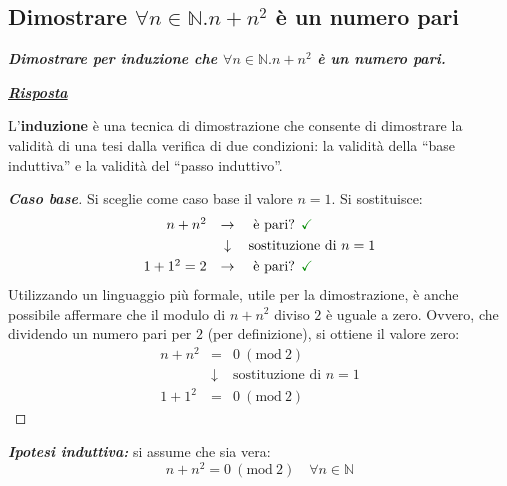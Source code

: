 \documentclass[a4paper]{article}
\newcommand{\dquotes}[1]{``#1''}
\begin{document}
	\subsection{Dimostrare $\forall n \in \mathbb{N}.n + n^{2}$ è un numero pari}
	
	\textcolor{Red3}{\textbf{\emph{Dimostrare per induzione che $\forall n \in \mathbb{N}.n + n^{2}$ è un numero pari.}}}\newline
	
	\noindent
	\textcolor{Green4}{\textbf{\emph{\underline{Risposta}}}}\newline
	
	\noindent	
	L'\textbf{induzione} è una tecnica di dimostrazione che consente di dimostrare la validità di una tesi dalla verifica di due condizioni: la validità della \dquotes{base induttiva} e la validità del \dquotes{passo induttivo}.
	\begin{proof}[\textbf{Caso base}]
		Si sceglie come caso base il valore $n = 1$. Si sostituisce:
		\begin{equation*}
			\begin{array}{rcl}
				n + n^{2} &\rightarrow& \text{ è pari? } \textcolor{Green4}{\checkmark} \\ [.3em]
				&\downarrow& \text{sostituzione di }n=1 \\ [.3em]
				1 + 1^{2} = 2 &\rightarrow& \text{ è pari? } \textcolor{Green4}{\checkmark}
			\end{array}
		\end{equation*}
		Utilizzando un linguaggio più formale, utile per la dimostrazione, è anche possibile affermare che il modulo di $n+n^{2}$ diviso $2$ è uguale a zero. Ovvero, che dividendo un numero pari per $2$ (per definizione), si ottiene il valore zero:
		\begin{equation*}
			\begin{array}{rcl}
				n+n^{2} &=& 0 \: \left(\mathrm{mod} \: 2\right) \\ [.3em]
				&\downarrow& \text{sostituzione di }n=1 \\ [.3em]
				1+1^{2} &=& 0 \: \left(\mathrm{mod} \: 2\right)
			\end{array}
		\end{equation*}
	\end{proof}
	
	\noindent
	\textbf{\emph{Ipotesi induttiva:}} si assume che sia vera:
	\begin{equation*}
		n+n^{2} = 0 \: \left(\mathrm{mod} \: 2\right) \hspace{1em} \forall n \in \mathbb{N}
	\end{equation*}
	
\end{document}
